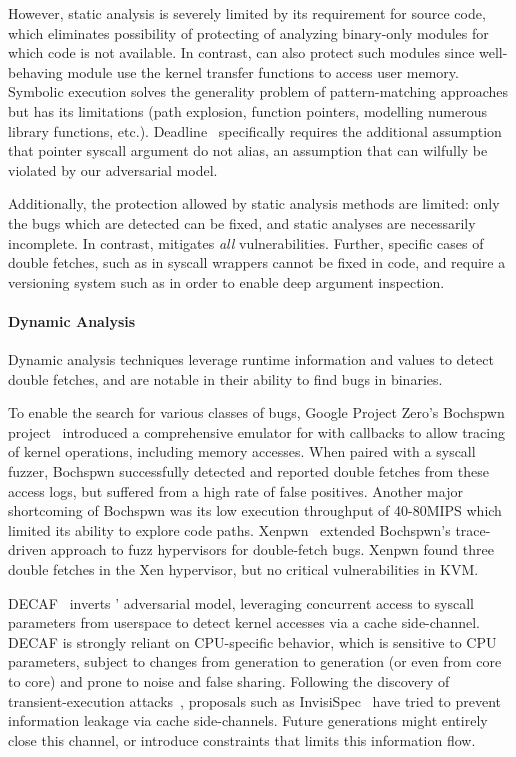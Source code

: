 However, static analysis is severely limited by its requirement for
source code, which eliminates possibility of protecting of analyzing
binary-only modules for which code is not available.
In contrast, \midas can also protect such modules since well-behaving
module use the kernel transfer functions to access user memory.
Symbolic execution solves the generality problem of pattern-matching
approaches but has its limitations (path explosion, function pointers,
modelling numerous library functions, etc.).
Deadline~\cite{deadline} specifically requires the additional assumption
that pointer syscall argument do not alias, an assumption that can
wilfully be violated by our adversarial model.

Additionally, the protection allowed by static analysis methods are
limited: only the bugs which are detected can be fixed, and static
analyses are necessarily incomplete.
In contrast, \midas mitigates \emph{all} \tocttou vulnerabilities.
Further, specific cases of double fetches, such as in syscall wrappers
cannot be fixed in code, and require a versioning system such as
\midas in order to enable deep argument inspection.

\paragraph{Dynamic Analysis}
%
Dynamic analysis techniques leverage runtime information and values
to detect double fetches, and are notable in their ability to
find bugs in binaries.

To enable the search for various classes of bugs, Google Project Zero's
Bochspwn project~\cite{jurczyk2013bochspwn} introduced
a comprehensive emulator for  with callbacks to allow
tracing of kernel operations, including memory accesses.
When paired with a syscall fuzzer,
Bochspwn successfully detected and reported double fetches from
these access logs, but suffered from a high rate of false positives.
Another major shortcoming of Bochspwn was its low execution throughput
of 40-80MIPS which limited its ability to explore code paths.
Xenpwn~\cite{wilhelm2016xenpwn} extended Bochspwn's trace-driven 
approach to fuzz hypervisors for double-fetch bugs.
Xenpwn found three double fetches in the Xen hypervisor, but no critical 
vulnerabilities in KVM.

DECAF~\cite{schwartzDECAF} inverts \midas' adversarial model, leveraging
concurrent access to syscall parameters from userspace to detect kernel
accesses via a cache side-channel.
DECAF is strongly reliant on CPU-specific behavior, which
is sensitive to CPU parameters, subject to changes from generation to
generation (or even from core to core) and prone to noise and false sharing.
Following the discovery of transient-execution attacks~\cite{KocherHFGGHHLM019},
proposals such as InvisiSpec~\cite{YanCS0FT19,KhasawnehKSEPA19} have
tried to prevent
information leakage via cache side-channels.
Future generations might entirely close this channel, or introduce constraints
that limits this information flow.


